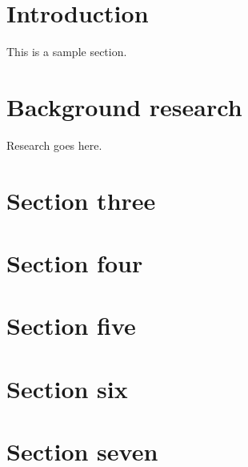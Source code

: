 \documentclass[11pt]{article} %
\theoremstyle{plain}
\theoremstyle{definition}
\begin{document}
\section{Introduction}

This is a sample section.

\section{Background research}

Research goes here.

\section{Section three}
\section{Section four}
\section{Section five}
\section{Section six}
\section{Section seven}



\end{document}
